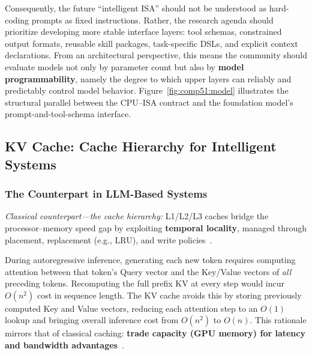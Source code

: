 Consequently, the future ``intelligent ISA'' should not be understood as hard-coding prompts as fixed instructions. Rather, the research agenda should prioritize developing more stable interface layers: tool schemas, constrained output formats, reusable skill packages, task-specific DSLs, and explicit context declarations.
From an architectural perspective, this means the community should evaluate models not only by parameter count but also by \textbf{model programmability}, namely the degree to which upper layers can reliably and predictably control model behavior.
Figure~\ref{fig:comp51:model} illustrates the structural parallel between the CPU--ISA contract and the foundation model's prompt-and-tool-schema interface.



\subsection{KV Cache: Cache Hierarchy for Intelligent Systems}
\label{sec:kv}

\subsubsection{The Counterpart in LLM-Based Systems}

\textit{Classical counterpart---the cache hierarchy:} L1/L2/L3 caches bridge the processor--memory speed gap by exploiting \textbf{temporal locality}, managed through placement, replacement (e.g., LRU), and write policies~\cite{drepper2007memory}.

During autoregressive inference, generating each new token requires computing attention between that token's Query vector and the Key/Value vectors of \textit{all} preceding tokens.
Recomputing the full prefix KV at every step would incur $O(n^2)$ cost in sequence length.
The KV cache avoids this by storing previously computed Key and Value vectors, reducing each attention step to an $O(1)$ lookup and bringing overall inference cost from $O(n^2)$ to $O(n)$.
This rationale mirrors that of classical caching: \textbf{trade capacity (GPU memory) for latency and bandwidth advantages}~\cite{drepper2007memory,kwon2023pagedattention}.

